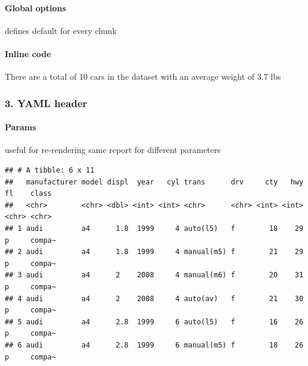 \documentclass[
]{article}
\newenvironment{Shaded}{\begin{snugshade}}{\end{snugshade}}
\newcommand{\AttributeTok}[1]{\textcolor[rgb]{0.77,0.63,0.00}{#1}}
\newcommand{\ConstantTok}[1]{\textcolor[rgb]{0.00,0.00,0.00}{#1}}
\newcommand{\FunctionTok}[1]{\textcolor[rgb]{0.00,0.00,0.00}{#1}}
\newcommand{\NormalTok}[1]{#1}
\newcommand{\SpecialCharTok}[1]{\textcolor[rgb]{0.00,0.00,0.00}{#1}}
\begin{document}
\hypertarget{global-options}{%
\paragraph{Global options}\label{global-options}}

defines default for every chunk

\begin{Shaded}
\end{Shaded}

\hypertarget{inline-code}{%
\paragraph{Inline code}\label{inline-code}}

There are a total of 10 cars in the dataset with an average weight of
3.7 lbs

\hypertarget{yaml-header}{%
\subsubsection{3. YAML header}\label{yaml-header}}

\hypertarget{params}{%
\paragraph{Params}\label{params}}

useful for re-rendering same report for different parameters

\begin{verbatim}
## # A tibble: 6 x 11
##   manufacturer model displ  year   cyl trans      drv     cty   hwy fl    class 
##   <chr>        <chr> <dbl> <int> <int> <chr>      <chr> <int> <int> <chr> <chr> 
## 1 audi         a4      1.8  1999     4 auto(l5)   f        18    29 p     compa~
## 2 audi         a4      1.8  1999     4 manual(m5) f        21    29 p     compa~
## 3 audi         a4      2    2008     4 manual(m6) f        20    31 p     compa~
## 4 audi         a4      2    2008     4 auto(av)   f        21    30 p     compa~
## 5 audi         a4      2.8  1999     6 auto(l5)   f        16    26 p     compa~
## 6 audi         a4      2.8  1999     6 manual(m5) f        18    26 p     compa~
\end{verbatim}
\end{document}
